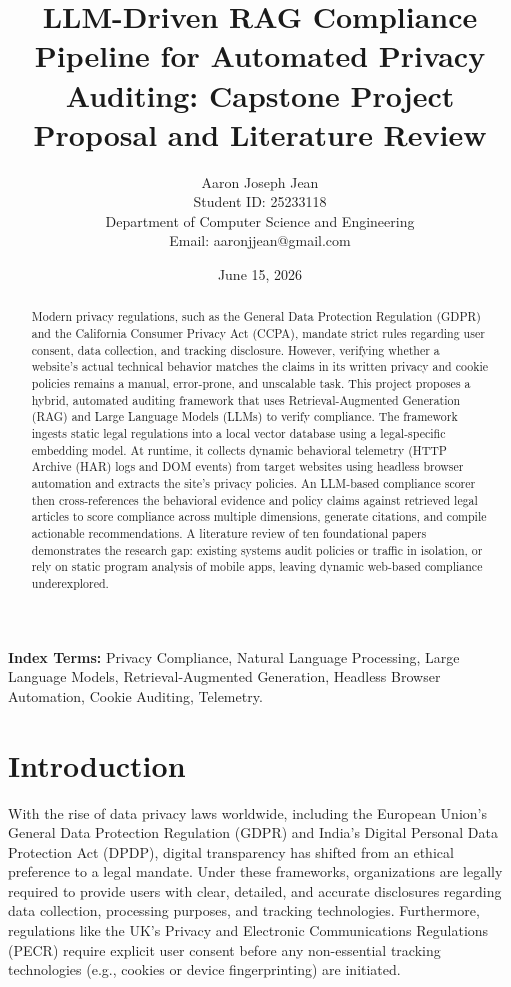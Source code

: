 \documentclass[11pt,a4paper]{article}
\title{LLM-Driven RAG Compliance Pipeline for Automated Privacy Auditing: Capstone Project Proposal and Literature Review}
\author{Aaron Joseph Jean \\ Student ID: 25233118 \\ Department of Computer Science and Engineering \\ Email: aaronjjean@gmail.com}
\date{June 15, 2026}
\begin{document}
\maketitle

\begin{abstract}
Modern privacy regulations, such as the General Data Protection Regulation (GDPR) and the California Consumer Privacy Act (CCPA), mandate strict rules regarding user consent, data collection, and tracking disclosure. However, verifying whether a website's actual technical behavior matches the claims in its written privacy and cookie policies remains a manual, error-prone, and unscalable task. This project proposes a hybrid, automated auditing framework that uses Retrieval-Augmented Generation (RAG) and Large Language Models (LLMs) to verify compliance. The framework ingests static legal regulations into a local vector database using a legal-specific embedding model. At runtime, it collects dynamic behavioral telemetry (HTTP Archive (HAR) logs and DOM events) from target websites using headless browser automation and extracts the site's privacy policies. An LLM-based compliance scorer then cross-references the behavioral evidence and policy claims against retrieved legal articles to score compliance across multiple dimensions, generate citations, and compile actionable recommendations. A literature review of ten foundational papers demonstrates the research gap: existing systems audit policies or traffic in isolation, or rely on static program analysis of mobile apps, leaving dynamic web-based compliance underexplored.
\end{abstract}

\noindent \textbf{Index Terms:} Privacy Compliance, Natural Language Processing, Large Language Models, Retrieval-Augmented Generation, Headless Browser Automation, Cookie Auditing, Telemetry.

\vspace{12pt}

\section{Introduction}
With the rise of data privacy laws worldwide, including the European Union's General Data Protection Regulation (GDPR) and India's Digital Personal Data Protection Act (DPDP), digital transparency has shifted from an ethical preference to a legal mandate. Under these frameworks, organizations are legally required to provide users with clear, detailed, and accurate disclosures regarding data collection, processing purposes, and tracking technologies. Furthermore, regulations like the UK's Privacy and Electronic Communications Regulations (PECR) require explicit user consent before any non-essential tracking technologies (e.g., cookies or device fingerprinting) are initiated.
\end{document}
